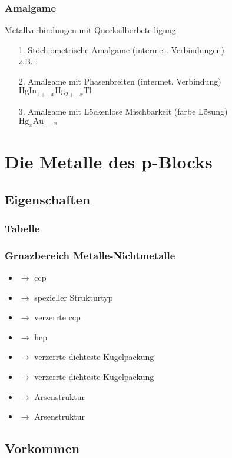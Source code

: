 \documentclass{article}
\begin{document}
\subsubsection{Amalgame}
Metallverbindungen mit Quecksilberbeteiligung
\begin{itemize}
    \item[1.] Stöchiometrische Amalgame (intermet. Verbindungen)\\z.B. ; 
    \item[2.] Amalgame mit Phasenbreiten (intermet. Verbindung)\\$\mathrm{HgIn}_{1 +- x} \mathrm{Hg}_{2 +- x}\mathrm{Tl}$
    \item[3.] Amalgame mit Löckenlose Mischbarkeit (farbe Lösung)\\$\mathrm{Hg}_x\mathrm{Au}_{1-x}$
\end{itemize}

\section{Die Metalle des p-Blocks}
\subsection{Eigenschaften}
\subsubsection{Tabelle}
\subsubsection{Grnazbereich Metalle-Nichtmetalle}
\begin{itemize}
    \item {} $\rightarrow$ ccp
    \item {} $\rightarrow$ spezieller Strukturtyp
    \item {} $\rightarrow$ verzerrte ccp
    \item {} $\rightarrow$ hcp
    \item {} $\rightarrow$ verzerrte dichteste Kugelpackung
    \item {} $\rightarrow$ verzerrte dichteste Kugelpackung
    \item {} $\rightarrow$ Arsenstruktur
    \item {} $\rightarrow$ Arsenstruktur
\end{itemize}
\subsection{Vorkommen}
\end{document}
